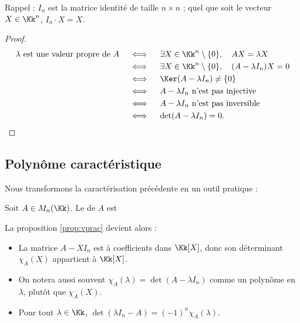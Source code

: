 \documentclass[11pt, class=report,crop=false]{standalone}
\begin{document}
Rappel : $I_n$ est la matrice identité de taille $n\times n$ ; quel que soit le vecteur $X \in \Kk^n$,
$I_n \cdot X = X$.

\begin{proof}

\begin{align*}
\lambda \text{ est une valeur propre de } A
&\quad\iff\quad \exists X \in \Kk^n \setminus\{0\}, \quad AX = \lambda X \\
&\quad\iff\quad \exists X \in \Kk^n \setminus\{0\}, \quad  (A -\lambda I_n)X = 0 \\
&\quad\iff\quad \Ker(A-\lambda I_n) \neq \{0\} \\
&\quad\iff\quad A- \lambda I_n \text{ n'est pas injective} \\
&\quad\iff\quad A -\lambda I_n \text{ n'est pas inversible} \\
&\quad\iff\quad \det (A-\lambda I_n) = 0 .
\end{align*}

\end{proof}


\subsection{Polynôme caractéristique}

Nous transformons la caractérisation précédente en un outil pratique :

\begin{definition}
Soit $ A \in M_n(\Kk)$.
Le  de $A$ est
\end{definition}



La proposition \ref{prop:vprac} devient alors :


\begin{remarque*}
\sauteligne
\begin{itemize}
  \item La matrice $A - XI_n$ est à coefficients dans $\Kk[X]$, donc son déterminant $\chi_A(X)$ appartient à $\Kk[X]$. 
  
  \item On notera aussi souvent $\chi_A(\lambda) = \det(A - \lambda I_n)$ comme un polynôme
  en $\lambda$, plutôt que $\chi_A(X)$.
    
  \item Pour tout $\lambda \in \Kk$, $\det (\lambda I_n-A) = (-1)^n\chi_A(\lambda)$.
\end{itemize}
\end{remarque*}
\end{document}
